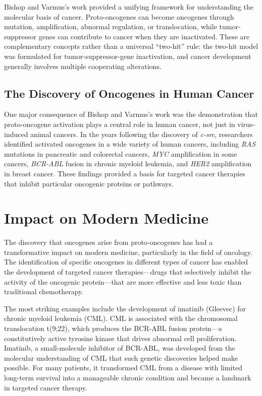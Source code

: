 Bishop and Varmus's work provided a unifying framework for understanding the molecular basis of cancer. Proto-oncogenes can become oncogenes through mutation, amplification, abnormal regulation, or translocation, while tumor-suppressor genes can contribute to cancer when they are inactivated. These are complementary concepts rather than a universal ``two-hit'' rule: the two-hit model was formulated for tumor-suppressor-gene inactivation, and cancer development generally involves multiple cooperating alterations.

\subsection{The Discovery of Oncogenes in Human Cancer}

One major consequence of Bishop and Varmus's work was the demonstration that proto-oncogene activation plays a central role in human cancer, not just in virus-induced animal cancers. In the years following the discovery of \emph{c-src}, researchers identified activated oncogenes in a wide variety of human cancers, including \emph{RAS} mutations in pancreatic and colorectal cancers, \emph{MYC} amplification in some cancers, \emph{BCR-ABL} fusion in chronic myeloid leukemia, and \emph{HER2} amplification in breast cancer. These findings provided a basis for targeted cancer therapies that inhibit particular oncogenic proteins or pathways.

\section{Impact on Modern Medicine}

The discovery that oncogenes arise from proto-oncogenes has had a transformative impact on modern medicine, particularly in the field of oncology. The identification of specific oncogenes in different types of cancer has enabled the development of targeted cancer therapies---drugs that selectively inhibit the activity of the oncogenic protein---that are more effective and less toxic than traditional chemotherapy.

The most striking examples include the development of imatinib (Gleevec) for chronic myeloid leukemia (CML). CML is associated with the chromosomal translocation t(9;22), which produces the BCR-ABL fusion protein---a constitutively active tyrosine kinase that drives abnormal cell proliferation. Imatinib, a small-molecule inhibitor of BCR-ABL, was developed from the molecular understanding of CML that such genetic discoveries helped make possible. For many patients, it transformed CML from a disease with limited long-term survival into a manageable chronic condition and became a landmark in targeted cancer therapy.

